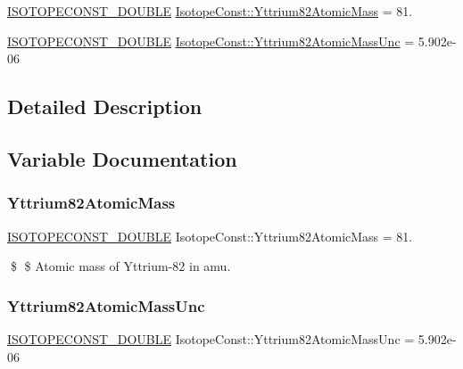 \begin{DoxyCompactItemize}
\item 
\mbox{\hyperlink{group___isotope_const-_macros_ga8f45a7272ce02c0b4c65c44636ed719a}{I\+S\+O\+T\+O\+P\+E\+C\+O\+N\+S\+T\+\_\+\+D\+O\+U\+B\+LE}} \mbox{\hyperlink{group___isotope_const-_yttrium-_y82_ga8143e2d665464cd35f86f7b7baadbd34}{Isotope\+Const\+::\+Yttrium82\+Atomic\+Mass}} = 81.
\item 
\mbox{\hyperlink{group___isotope_const-_macros_ga8f45a7272ce02c0b4c65c44636ed719a}{I\+S\+O\+T\+O\+P\+E\+C\+O\+N\+S\+T\+\_\+\+D\+O\+U\+B\+LE}} \mbox{\hyperlink{group___isotope_const-_yttrium-_y82_ga9e0b05ad82b970c534823e9fc23e9cf5}{Isotope\+Const\+::\+Yttrium82\+Atomic\+Mass\+Unc}} = 5.\+902e-\/06
\end{DoxyCompactItemize}


\subsection{Detailed Description}


\subsection{Variable Documentation}
\mbox{\label{group___isotope_const-_yttrium-_y82_ga8143e2d665464cd35f86f7b7baadbd34}} 
\subsubsection{\texorpdfstring{Yttrium82\+Atomic\+Mass}{Yttrium82AtomicMass}}
{\footnotesize\ttfamily \mbox{\hyperlink{group___isotope_const-_macros_ga8f45a7272ce02c0b4c65c44636ed719a}{I\+S\+O\+T\+O\+P\+E\+C\+O\+N\+S\+T\+\_\+\+D\+O\+U\+B\+LE}} Isotope\+Const\+::\+Yttrium82\+Atomic\+Mass = 81.}

\$ \$ Atomic mass of Yttrium-\/82 in amu. \mbox{\label{group___isotope_const-_yttrium-_y82_ga9e0b05ad82b970c534823e9fc23e9cf5}} 
\subsubsection{\texorpdfstring{Yttrium82\+Atomic\+Mass\+Unc}{Yttrium82AtomicMassUnc}}
{\footnotesize\ttfamily \mbox{\hyperlink{group___isotope_const-_macros_ga8f45a7272ce02c0b4c65c44636ed719a}{I\+S\+O\+T\+O\+P\+E\+C\+O\+N\+S\+T\+\_\+\+D\+O\+U\+B\+LE}} Isotope\+Const\+::\+Yttrium82\+Atomic\+Mass\+Unc = 5.\+902e-\/06}

